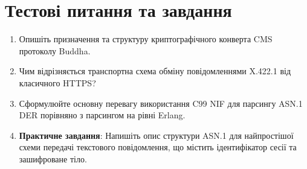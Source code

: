 \section{Тестові питання та завдання}
\begin{enumerate}
    \item Опишіть призначення та структуру криптографічного конверта CMS протоколу Buddha.
    \item Чим відрізняється транспортна схема обміну повідомленнями X.422.1 від класичного HTTPS?
    \item Сформулюйте основну перевагу використання C99 NIF для парсингу ASN.1 DER порівняно з парсингом на рівні Erlang.
    \item \textbf{Практичне завдання}: Напишіть опис структури ASN.1 для найпростішої схеми передачі текстового повідомлення, що містить ідентифікатор сесії та зашифроване тіло.
\end{enumerate}
